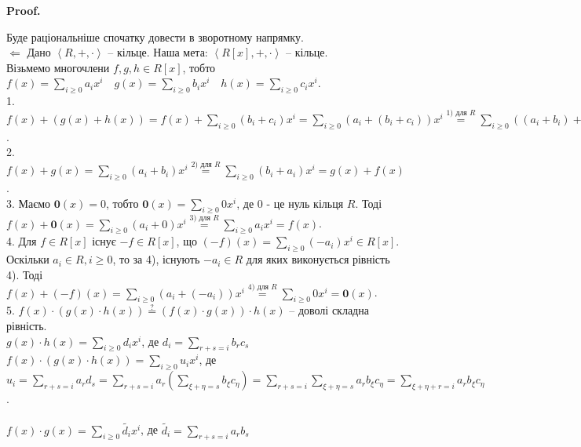 \documentclass[a4paper, 10pt]{article}
\makeatletter
\def\leftproof{$\boxed{\Leftarrow}$ }
\theoremstyle{theoremdd}
\theoremstyle{theoremdd}
\theoremstyle{theoremdd}
\theoremstyle{theoremdd}
\theoremstyle{theoremdd}
\theoremstyle{theoremdd}
\theoremstyle{theoremdd}
\theoremstyle{theoremdd}
\theoremstyle{theoremdd}
\theoremstyle{theoremdd}
\theoremstyle{theoremdd}
\theoremstyle{theoremdd}
\theoremstyle{theoremdd}
\theoremstyle{theoremdd}
\theoremstyle{theoremdd}
\renewenvironment{proof}[1][Proof.\\]{\par
\pushQED{\hfill \qed}%
\normalfont \topsep6\p@\@plus6\p@\relax
\trivlist
\item\relax
{\bfseries
#1\@addpunct{.}}\hspace\labelsep\ignorespaces
}{%
\popQED\endtrivlist\@endpefalse
}
\makeatother
\begin{document}
\begin{proof}
Буде раціональніше спочатку довести в зворотному напрямку.\\
\leftproof Дано $\left< R,+,\cdot\right>$ -- кільце. Наша мета: $\left<R[x],+,\cdot\right>$ -- кільце.\\
Візьмемо многочлени $f,g,h \in R[x]$, тобто $f(x) = \displaystyle\sum_{i \geq 0} a_i x^i \quad g(x) = \displaystyle\sum_{i \geq 0} b_i x^i \quad h(x) = \displaystyle\sum_{i \geq 0} c_i x^i$.\\
1. $f(x) + (g(x) + h(x)) = f(x) + \displaystyle\sum_{i \geq 0} (b_i + c_i) x^i = \sum_{i \geq 0} (a_i + (b_i + c_i)) x^i \overset{1) \text{ для } R}{=} \sum_{i \geq 0} ((a_i + b_i) + c_i) x^i = (f(x)+g(x)) + \sum_{i \geq 0} c_i x^i = (f(x)+g(x)) + h(x)$.\\
2. $f(x) + g(x) = \displaystyle\sum_{i \geq 0} (a_i + b_i) x^i \overset{2) \text{ для } R}{=} \sum_{i \geq 0} (b_i + a_i) x^i = g(x) + f(x)$.\\
3. Маємо $\textbf{0}(x) = 0$, тобто $\textbf{0}(x) = \displaystyle\sum_{i \geq 0} 0x^i$, де $0$ - це нуль кільця $R$. Тоді \\ $f(x) + \textbf{0}(x) = \displaystyle\sum_{i \geq 0} (a_i + 0) x^i \overset{3) \text{ для } R}{=} \sum_{i \geq 0} a_i x^i = f(x)$.\\
4. Для $f \in R[x]$ існує $-f \in R[x]$, що $(-f)(x) = \displaystyle\sum_{i \geq 0} (-a_i) x^i \in R[x]$. Оскільки $a_i \in R, i \geq 0$, то за 4), існують $-a_i \in R$ для яких виконується рівність 4). Тоді \\
$f(x) + (-f)(x) = \displaystyle\sum_{i \geq 0} (a_i + (-a_i)) x^i \overset{4) \text{ для } R}{=}  \sum_{i \geq 0} 0 x^i = \textbf{0}(x)$.
\bigskip \\
5. $f(x) \cdot (g(x) \cdot h(x)) \overset{?}{=} (f(x) \cdot g(x)) \cdot h(x)$ -- доволі складна рівність.\\
$g(x) \cdot h(x) = \displaystyle\sum_{i \geq 0} d_i x^i$, де \quad $d_i = \displaystyle\sum_{r + s = i} b_r c_s$\\
$f(x) \cdot (g(x) \cdot h(x)) = \displaystyle\sum_{i \geq 0} u_i x^i$, де \\
$u_i = \displaystyle\sum_{r+s=i} a_r d_s = \sum_{r+s=i} a_r \left( \sum_{\xi + \eta = s} b_\xi c_\eta \right) = \sum_{r+s=i} \sum_{\xi + \eta = s} a_r b_\xi c_\eta = \sum_{\xi+\eta+r=i} a_r b_\xi c_\eta$.\\
\bigskip \\
$f(x) \cdot g(x) = \displaystyle\sum_{i \geq 0} \tilde{d_i} x^i$, де \quad $\tilde{d_i} = \displaystyle\sum_{r+s=i} a_r b_s$\\

\end{proof}
\end{document}
